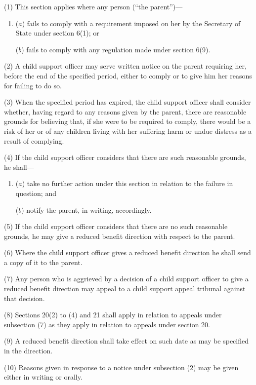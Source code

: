 \documentclass[12pt,a4paper]{article}
\begin{document}
(1) This section applies where any person (“the parent”)—
\begin{enumerate}\item[]
($a$) fails to comply with a requirement imposed on her by the Secretary of State under section 6(1); or

($b$) fails to comply with any regulation made under section 6(9).
\end{enumerate}

(2) A child support officer may serve written notice on the parent requiring her, before the end of the specified period, either to comply or to give him her reasons for failing to do so.

(3) When the specified period has expired, the child support officer shall consider whether, having regard to any reasons given by the parent, there are reasonable grounds for believing that, if she were to be required to comply, there would be a risk of her or of any children living with her suffering harm or undue distress as a result of complying.

(4) If the child support officer considers that there are such reasonable grounds, he shall—
\begin{enumerate}\item[]
($a$) take no further action under this section in relation to the failure in question; and

($b$) notify the parent, in writing, accordingly.
\end{enumerate}

(5) If the child support officer considers that there are no such reasonable grounds, he may give a reduced benefit direction with respect to the parent.

(6) Where the child support officer gives a reduced benefit direction he shall send a copy of it to the parent.

(7) Any person who is aggrieved by a decision of a child support officer to give a reduced benefit direction may appeal to a child support appeal tribunal against that decision.

(8) Sections 20(2)  to (4)  and 21 shall apply in relation to appeals under subsection (7)  as they apply in relation to appeals under section 20.

(9) A reduced benefit direction shall take effect on such date as may be specified in the direction.

(10) Reasons given in response to a notice under subsection (2)  may be given either in writing or orally.
\end{document}
